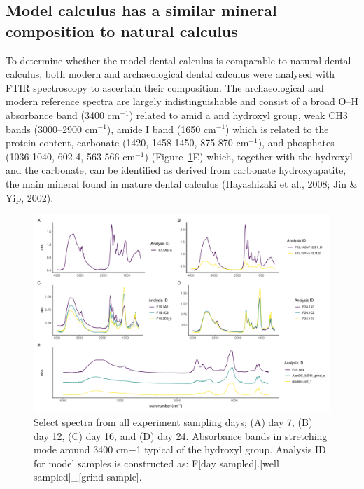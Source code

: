 \documentclass[
]{article}
\begin{document}
\hypertarget{model-calculus-has-a-similar-mineral-composition-to-natural-calculus}{%
\subsection{Model calculus has a similar mineral composition to natural
calculus}\label{model-calculus-has-a-similar-mineral-composition-to-natural-calculus}}

To determine whether the model dental calculus is comparable to natural
dental calculus, both modern and archaeological dental calculus were
analysed with FTIR spectroscopy to ascertain their composition. The
archaeological and modern reference spectra are largely
indistinguishable and consist of a broad O--H absorbance band (3400
cm\(^{-1}\)) related to amid a and hydroxyl group, weak CH3 bands
(3000--2900 cm\(^{-1}\)), amide I band (1650 cm\(^{-1}\)) which is
related to the protein content, carbonate (1420, 1458-1450, 875-870
cm\(^{-1}\)), and phosphates (1036-1040, 602-4, 563-566 cm\(^{-1}\))
(Figure~\ref{fig-ftir-spectra}E) which, together with the hydroxyl and
the carbonate, can be identified as derived from carbonate
hydroxyapatite, the main mineral found in mature dental calculus
(Hayashizaki et al., 2008; Jin \& Yip, 2002).

\begin{figure}

{\centering \includegraphics{index_files/figure-pdf/fig-ftir-spectra-1.pdf}

}

\caption{\label{fig-ftir-spectra}Select spectra from all experiment
sampling days; (A) day 7, (B) day 12, (C) day 16, and (D) day 24.
Absorbance bands in stretching mode around 3400 cm−1 typical of the
hydroxyl group. Analysis ID for model samples is constructed as: F{[}day
sampled{]}.{[}well sampled{]}\_{[}grind sample{]}.}

\end{figure}
\end{document}

